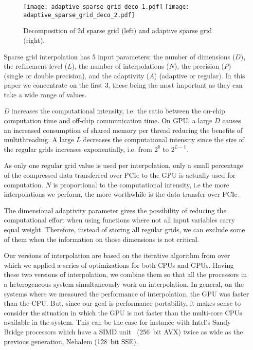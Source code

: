 \begin{figure}[h]
  \centering
  \texttt{[image: adaptive\_sparse\_grid\_deco\_1.pdf]}
  \hspace{0cm}
  \texttt{[image: adaptive\_sparse\_grid\_deco\_2.pdf]}
  \caption{Decomposition of 2d sparse grid (left) and adaptive sparse grid
  (right).}
  \label{fig:adaptive_sparse_grid_deco}
\end{figure}

Sparse grid interpolation has 5 input parameters: the number of dimensions
($D$), the refinement level ($L$), the number of interpolations ($N$), the
precision ($P$) (single or double precision), and the adaptivity ($A$) (adaptive
or regular). In this paper we concentrate on the first 3, these being the most
important as they can take a wide range of values.

$D$ increases the computational intensity, i.e. the ratio between the on-chip
computation time and off-chip communication time. On GPU, a large $D$ causes an
increased consumption of shared memory per thread reducing the benefits of
multithreading. A large $L$ decreases the computational intensity since the size
of the regular grids increases exponentially, i.e. from $2^0$ to $2^{L-1}$. 

As only one regular grid value is used per interpolation, only a small
percentage of the compressed data transferred over PCIe to the GPU is actually
used for computation. $N$ is proportional to the computational intensity, i.e
the more interpolations we perform, the more worthwhile is the data transfer over
PCIe.

The dimensional adaptivity parameter gives the possibility of reducing the
computational effort when using functions where not all input variables carry
equal weight. Therefore, instead of storing all regular grids, we can exclude
some of them when the information on those dimensions is not critical.

Our versions of interpolation are based on the iterative algorithm from
\cite{murarasu2011} over which we applied a series of optimizations for both
CPUs and GPUs. Having these two versions of interpolation, we combine them so
that all the processors in a heterogeneous system simultaneously work on
interpolation. In general, on the systems where we measured the performance of
interpolation, the GPU was faster than the CPU. But, since our goal is
performance portability, it makes sense to consider the situation in which the
GPU is not faster than the multi-core CPUs available in the system. This can be
the case for instance with Intel's Sandy Bridge processors which have a SIMD
unit~\cite{avx} (256~bit AVX) twice as wide as the previous generation, Nehalem
(128~bit SSE).

